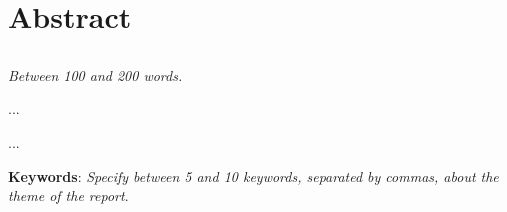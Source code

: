 \chapter{Abstract}
\section*{\textit{\TITULO}}

\textit{Between 100 and 200 words.}

...

...



\textbf{Keywords}: \textit{Specify between 5 and 10 keywords, separated by commas, about the theme of the report}.